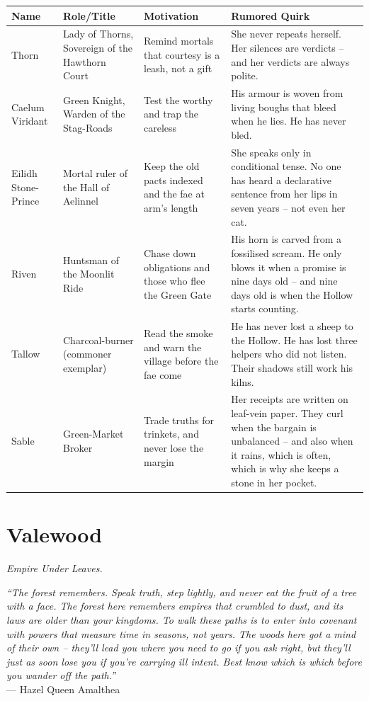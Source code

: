 \documentclass[12pt,oneside]{book}
\begin{document}
\begin{longtable}{|p{}|p{}|p{}|p{}|}
\hline
\textbf{Name} & \textbf{Role/Title} & \textbf{Motivation} & \textbf{Rumored Quirk} \\
\hline
Thorn & Lady of Thorns, Sovereign of the Hawthorn Court & Remind mortals that courtesy is a leash, not a gift & She never repeats herself. Her silences are verdicts -- and her verdicts are always polite. \\
\hline
Caelum Viridant & Green Knight, Warden of the Stag-Roads & Test the worthy and trap the careless & His armour is woven from living boughs that bleed when he lies. He has never bled. \\
\hline
Eilidh Stone-Prince & Mortal ruler of the Hall of Aelinnel & Keep the old pacts indexed and the fae at arm's length & She speaks only in conditional tense. No one has heard a declarative sentence from her lips in seven years -- not even her cat. \\
\hline
Riven & Huntsman of the Moonlit Ride & Chase down obligations and those who flee the Green Gate & His horn is carved from a fossilised scream. He only blows it when a promise is nine days old -- and nine days old is when the Hollow starts counting. \\
\hline
Tallow & Charcoal-burner (commoner exemplar) & Read the smoke and warn the village before the fae come & He has never lost a sheep to the Hollow. He has lost three helpers who did not listen. Their shadows still work his kilns. \\
\hline
Sable & Green-Market Broker & Trade truths for trinkets, and never lose the margin & Her receipts are written on leaf-vein paper. They curl when the bargain is unbalanced -- and also when it rains, which is often, which is why she keeps a stone in her pocket. \\
\hline
\end{longtable}



\newpage

\chapter{Valewood}
\emph{Empire Under Leaves.}

\noindent
\textit{``The forest remembers. Speak truth, step lightly, and never eat the fruit of a tree with a face. The forest here remembers empires that crumbled to dust, and its laws are older than your kingdoms. To walk these paths is to enter into covenant with powers that measure time in seasons, not years. The woods here got a mind of their own -- they'll lead you where you need to go if you ask right, but they'll just as soon lose you if you're carrying ill intent. Best know which is which before you wander off the path.''} \\
--- Hazel Queen Amalthea
\end{document}
